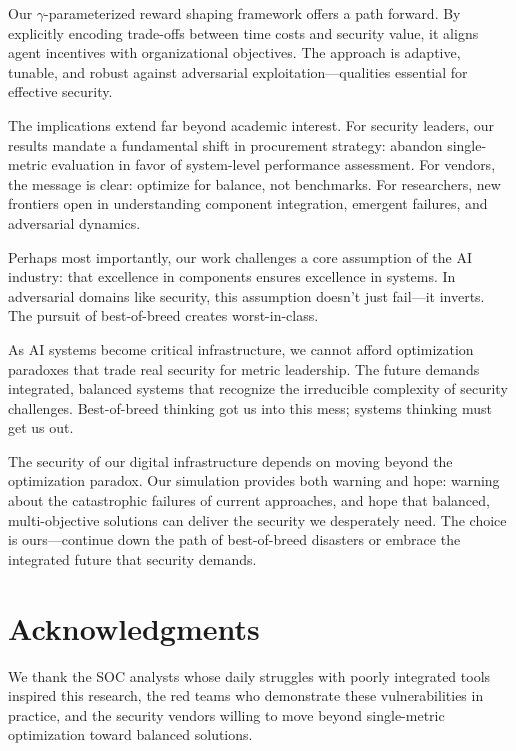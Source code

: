 \documentclass[10pt,conference]{IEEEtran}
\begin{document}
Our $\gamma$-parameterized reward shaping framework offers a path forward. By explicitly encoding trade-offs between time costs and security value, it aligns agent incentives with organizational objectives. The approach is adaptive, tunable, and robust against adversarial exploitation---qualities essential for effective security.

The implications extend far beyond academic interest. For security leaders, our results mandate a fundamental shift in procurement strategy: abandon single-metric evaluation in favor of system-level performance assessment. For vendors, the message is clear: optimize for balance, not benchmarks. For researchers, new frontiers open in understanding component integration, emergent failures, and adversarial dynamics.

Perhaps most importantly, our work challenges a core assumption of the AI industry: that excellence in components ensures excellence in systems. In adversarial domains like security, this assumption doesn't just fail---it inverts. The pursuit of best-of-breed creates worst-in-class.

As AI systems become critical infrastructure, we cannot afford optimization paradoxes that trade real security for metric leadership. The future demands integrated, balanced systems that recognize the irreducible complexity of security challenges. Best-of-breed thinking got us into this mess; systems thinking must get us out.

The security of our digital infrastructure depends on moving beyond the optimization paradox. Our simulation provides both warning and hope: warning about the catastrophic failures of current approaches, and hope that balanced, multi-objective solutions can deliver the security we desperately need. The choice is ours---continue down the path of best-of-breed disasters or embrace the integrated future that security demands.

\section*{Acknowledgments}
We thank the SOC analysts whose daily struggles with poorly integrated tools inspired this research, the red teams who demonstrate these vulnerabilities in practice, and the security vendors willing to move beyond single-metric optimization toward balanced solutions.
\end{document}
